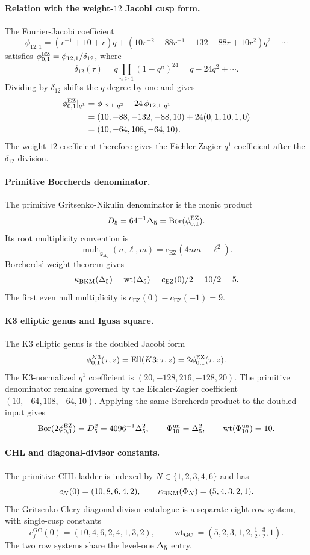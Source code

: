 \paragraph{Relation with the weight-$12$ Jacobi cusp form.}
The Fourier-Jacobi coefficient
\[
  \phi_{12,1}
  =
  (r^{-1}+10+r)q
  +(10r^{-2}-88r^{-1}-132-88r+10r^2)q^2+\cdots
\]
satisfies $\phi_{0,1}^{\mathrm{EZ}}=\phi_{12,1}/\delta_{12}$, where
\[
  \delta_{12}(\tau)
  =
  q\prod_{n\ge 1}(1-q^n)^{24}
  =
  q-24q^2+\cdots .
\]
Dividing by $\delta_{12}$ shifts the $q$-degree by one and gives
\[
\begin{aligned}
  \phi_{0,1}^{\mathrm{EZ}}|_{q^1}
  &=
  \phi_{12,1}|_{q^2}
  +24\,\phi_{12,1}|_{q^1}  \\
  &=
  (10,-88,-132,-88,10)
  +24(0,1,10,1,0)  \\
  &=
  (10,-64,108,-64,10).
\end{aligned}
\]
The weight-$12$ coefficient therefore gives the Eichler-Zagier
$q^1$ coefficient after the $\delta_{12}$ division.

\paragraph{Primitive Borcherds denominator.}
The primitive Gritsenko-Nikulin denominator is the monic product
\[
  D_5=64^{-1}\Delta_5=\operatorname{Bor}(\phi_{0,1}^{\mathrm{EZ}}).
\]
Its root multiplicity convention is
\[
  \operatorname{mult}_{\mathfrak g_{\Delta_5}}(n,\ell,m)
  =
  c_{\mathrm{EZ}}(4nm-\ell^2).
\]
Borcherds' weight theorem gives
\[
  \kappa_{\mathrm{BKM}}(\Delta_5)
  =
  \operatorname{wt}(\Delta_5)
  =
  c_{\mathrm{EZ}}(0)/2
  =
  10/2
  =
  5.
\]
The first even null multiplicity is
$c_{\mathrm{EZ}}(0)-c_{\mathrm{EZ}}(-1)=9$.

\paragraph{K3 elliptic genus and Igusa square.}
The K3 elliptic genus is the doubled Jacobi form
\[
  \phi_{0,1}^{K3}(\tau,z)=\operatorname{Ell}(K3;\tau,z)=2\phi_{0,1}^{\mathrm{EZ}}(\tau,z).
\]
The K3-normalized $q^1$ coefficient is
$(20,-128,216,-128,20)$. The primitive denominator remains governed by
the Eichler-Zagier coefficient $(10,-64,108,-64,10)$.
Applying the same Borcherds product to the doubled input gives
\[
  \operatorname{Bor}(2\phi_{0,1}^{\mathrm{EZ}})=D_5^2=4096^{-1}\Delta_5^2,
  \qquad
  \Phi_{10}^{\mathrm{un}}=\Delta_5^2,
  \qquad
  \operatorname{wt}(\Phi_{10}^{\mathrm{un}})=10.
\]

\paragraph{CHL and diagonal-divisor constants.}
The primitive CHL ladder is indexed by $N\in\{1,2,3,4,6\}$ and has
\[
  c_N(0)=(10,8,6,4,2),
  \qquad
  \kappa_{\mathrm{BKM}}(\Phi_N)=(5,4,3,2,1).
\]
The Gritsenko-Clery diagonal-divisor catalogue is a separate eight-row
system, with single-cusp constants
\[
  c_j^{\mathrm{GC}}(0)=(10,4,6,2,4,1,3,2),
  \qquad
  \operatorname{wt}_{\mathrm{GC}}=(5,2,3,1,2,\tfrac12,\tfrac32,1).
\]
The two row systems share the level-one $\Delta_5$ entry.

